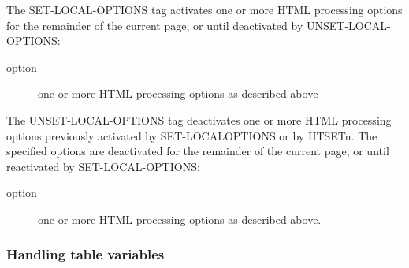 \documentclass[letterpaper,10pt,english]{sphinxmanual}
\begin{document}

The SET-LOCAL-OPTIONS tag activates one or more HTML processing options for the remainder of the current page, or until deactivated by UNSET-LOCAL-OPTIONS:

\begin{sphinxVerbatim}[commandchars=\\\{\}]
     
\end{sphinxVerbatim}
\begin{description}
\item[{option}] \leavevmode
one or more HTML processing options as described above

\end{description}


The UNSET-LOCAL-OPTIONS tag deactivates one or more HTML processing options previously activated by SET-LOCALOPTIONS or by HTSETn. The specified options are deactivated for the remainder of the current page, or until reactivated by SET-LOCAL-OPTIONS:

\begin{sphinxVerbatim}[commandchars=\\\{\}]
     
\end{sphinxVerbatim}
\begin{description}
\item[{option}] \leavevmode
one or more HTML processing options as described above.

\end{description}


\subsubsection{Handling table variables}
\label{\detokenize{User_Guide:handling-table-variables}}\label{\detokenize{User_Guide:v457ug-table-variables}}
\end{document}
